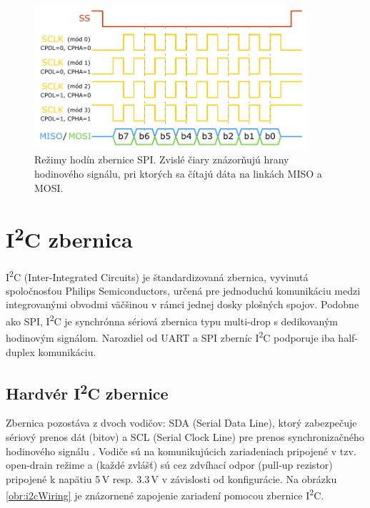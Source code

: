 \begin{figure}
    \centerline{\includegraphics[width=0.9\textwidth]{images/busses/spiClocks.pdf}}
    \caption[Režimy hodín zbernice SPI]{Režimy hodín zbernice SPI. Zvislé čiary znázorňujú hrany hodinového signálu, pri ktorých sa čítajú dáta na linkách MISO a MOSI.}
    \label{obr:spiModes}
\end{figure}

\section{I\textsuperscript{2}C zbernica}
I\textsuperscript{2}C (Inter-Integrated Circuits) je štandardizovaná zbernica, vyvinutá spoločnosťou Philips Semiconductors, určená pre jednoduchú komunikáciu medzi integrovanými obvodmi \cite{i2cSpec} väčšinou v rámci jednej dosky plošných spojov. Podobne ako SPI, I\textsuperscript{2}C je synchrónna sériová zbernica typu multi-drop s dedikovaným hodinovým signálom. Narozdiel od UART a SPI zberníc I\textsuperscript{2}C podporuje iba half-duplex komunikáciu.

\subsection{Hardvér I\textsuperscript{2}C zbernice}
Zbernica pozostáva z dvoch vodičov: SDA (Serial Data Line), ktorý zabezpečuje sériový prenos dát (bitov) a SCL (Serial Clock Line) pre prenos synchronizačného hodinového signálu \cite{i2cSpec}. Vodiče sú na komunikujúcich zariadeniach pripojené v tzv. open-drain režime a (každé zvlášť) sú cez zdvíhací odpor (pull-up rezistor) pripojené k napätiu 5\,V resp. 3.3\,V v závislosti od konfigurácie. Na obrázku \ref{obr:i2cWiring} je znázornené zapojenie zariadení pomocou zbernice I\textsuperscript{2}C.


